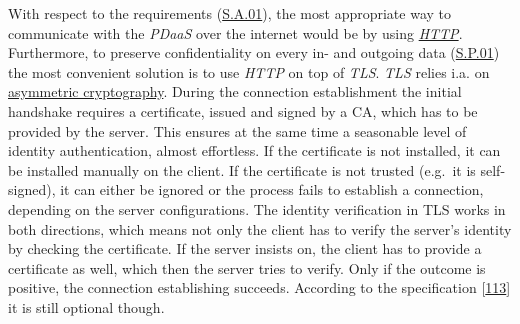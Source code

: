 \documentclass[12pt,english,a4paper,titlepage,cleardoublepage=empty,dottedtoc]{report}
\begin{document}
With respect to the requirements (\protect\hyperlink{sa01}{S.A.01}), the
most appropriate way to communicate with the \emph{PDaaS} over the
internet would be by using \emph{\protect\hyperlink{link_http}{HTTP}}.
Furthermore, to preserve confidentiality on every in- and outgoing data
(\protect\hyperlink{sp01}{S.P.01}) the most convenient solution is to
use \emph{HTTP} on top of \emph{TLS}. \emph{TLS} relies i.a. on
\protect\hyperlink{link_asym-crypto}{asymmetric cryptography}. During
the connection establishment the initial handshake requires a
certificate, issued and signed by a CA, which has to be provided by the
server. This ensures at the same time a seasonable level of identity
authentication, almost effortless. If the certificate is not installed,
it can be installed manually on the client. If the certificate is not
trusted (e.g.~it is self-signed), it can either be ignored or the
process fails to establish a connection, depending on the server
configurations. The identity verification in TLS works in both
directions, which means not only the client has to verify the server's
identity by checking the certificate. If the server insists on, the
client has to provide a certificate as well, which then the server tries
to verify. Only if the outcome is positive, the connection establishing
succeeds. According to the specification
{[}\protect\hyperlink{ref-web_spec_tls-12_client-auth}{113}{]} it is
still optional though.
\end{document}
